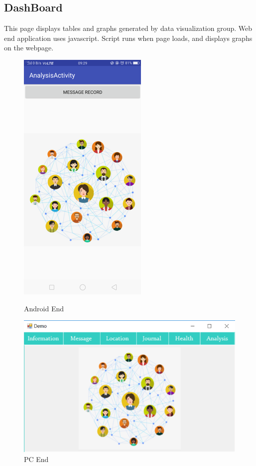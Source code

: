 \documentclass{article}
\begin{document}
\subsection{DashBoard}
This page displays tables and graphs generated by data visualization group. Web end application uses javascript. Script runs when page loads, and displays graphs on the webpage.
 	\begin{figure}[H] 	
 		\begin{minipage}[b]{0.28\linewidth}
		 	\centering
	 		\includegraphics{img/social3.png}
 			\caption{Android End}
 		\end{minipage}
 		\begin{minipage}[b]{0.68\linewidth} 		
 	 		\centering
 			\includegraphics{img/social1.png}
 			\caption{PC End}
	 	\end{minipage}
 	\end{figure}
 	
\end{document}
